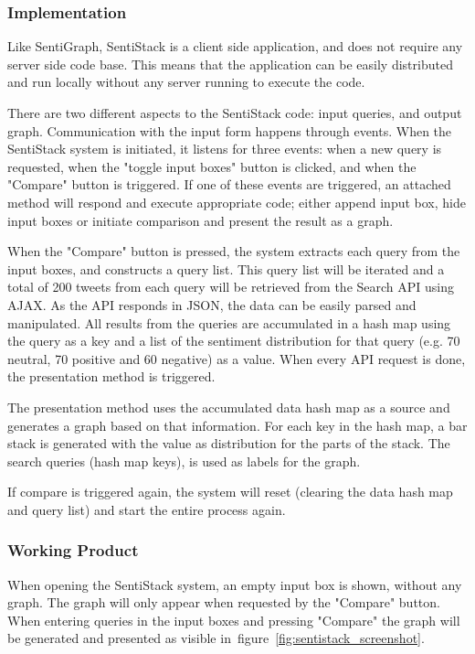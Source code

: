 \subsubsection{Implementation}

Like SentiGraph, SentiStack is a client side application, and does not require any server side code base. This means that the application can be easily distributed and run locally without any server running to execute the code. 

There are two different aspects to the SentiStack code: input queries, and output graph. Communication with the input form happens through events. When the SentiStack system is initiated, it listens for three events: when a new query is requested, when the "toggle input boxes" button is clicked, and when the "Compare" button is triggered. If one of these events are triggered, an attached method will respond and execute appropriate code; either append input box, hide input boxes or initiate comparison and present the result as a graph.

When the "Compare" button is pressed, the system extracts each query from the input boxes, and constructs a query list. This query list will be iterated and a total of 200 tweets from each query will be retrieved from the Search API using AJAX. As the API responds in JSON, the data can be easily parsed and manipulated. All results from the queries are accumulated in a hash map using the query as a key and a list of the sentiment distribution for that query (e.g. 70 neutral, 70 positive and 60 negative) as a value. When every API request is done, the presentation method is triggered.

The presentation method uses the accumulated data hash map as a source and generates a graph based on that information. For each key in the hash map, a bar stack is generated with the value as distribution for the parts of the stack. The search queries (hash map keys), is used as labels for the graph.

If compare is triggered again, the system will reset (clearing the data hash map and query list) and start the entire process again.

\subsubsection{Working Product}

When opening the SentiStack system, an empty input box is shown, without any graph. The graph will only appear when requested by the "Compare" button. When entering queries in the input boxes and pressing "Compare" the graph will be generated and presented as visible in~figure~\ref{fig:sentistack_screenshot}. 

